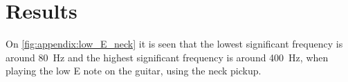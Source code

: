 \section*{Results}


On  \autoref{fig:appendix:low_E_neck} it is seen that the lowest significant frequency is around \SI{80}{\hertz} and the highest significant frequency is around \SI{400}{\hertz}, when playing the low E note on the guitar, using the neck pickup.

